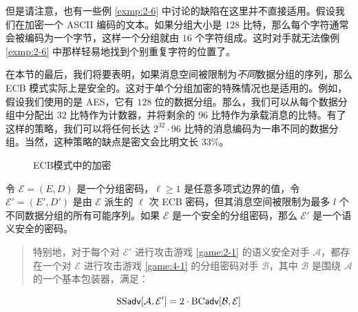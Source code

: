 但是请注意，也有一些例 \ref{exmp:2-6} 中讨论的缺陷在这里并不直接适用。假设我们在加密一个 ASCII 编码的文本。如果分组大小是 $128$ 比特，那么每个字符通常会被编码为一个字节，这样一个分组就由 $16$ 个字符组成。这时对手就无法像例 \ref{exmp:2-6} 中那样轻易地找到个别重复字符的位置了。

\vspace{8pt}

在本节的最后，我们将要表明，如果消息空间被限制为\emph{不同}数据分组的序列，那么 ECB 模式实际上是安全的。这对于单个分组加密的特殊情况也是适用的。例如，假设我们使用的是 AES，它有 $128$ 位的数据分组。那么，我们可以从每个数据分组中分配出 $32$ 比特作为计数器，并将剩余的 $96$ 比特作为承载消息的比特。有了这样的策略，我们可以将任何长达 $2^{32}\cdot 96$ 比特的消息编码为一串不同的数据分组。当然，这种策略的缺点是密文会比明文长 $33\%$。

\begin{figure}
  \centering
  \quad\quad\quad\quad\quad
  \caption{ECB模式中的加密}
  \label{fig:4-5}
\end{figure}

\begin{theorem}\label{theo:4-1}
令 $\mathcal{E}=(E,D)$ 是一个分组密码，$\ell\geq1$ 是任意多项式边界的值，令 $\mathcal{E}'=(E',D')$ 是由 $\mathcal{E}$ 派生的 $\ell$ 次 ECB 密码，但其消息空间被限制为最多 $l$ 个不同数据分组的所有可能序列。如果 $\mathcal{E}$ 是一个安全的分组密码，那么 $\mathcal{E}'$ 是一个语义安全的密码。
\begin{quote}
特别地，对于每个对 $\mathcal{E}'$ 进行攻击游戏 \ref{game:2-1} 的语义安全对手 $\mathcal{A}$，都存在一个对 $\mathcal{E}$ 进行攻击游戏 \ref{game:4-1} 的分组密码对手 $\mathcal{B}$，其中 $\mathcal{B}$ 是围绕 $\mathcal{A}$ 的一个基本包装器，满足：
\end{quote}
\begin{equation}\label{eq:4-3}
{\rm SS\mathsf{adv}}[\mathcal{A},\mathcal{E}']=2\cdot{\rm BC\mathsf{adv}}[\mathcal{B},\mathcal{E}]
\end{equation}
\end{theorem}

